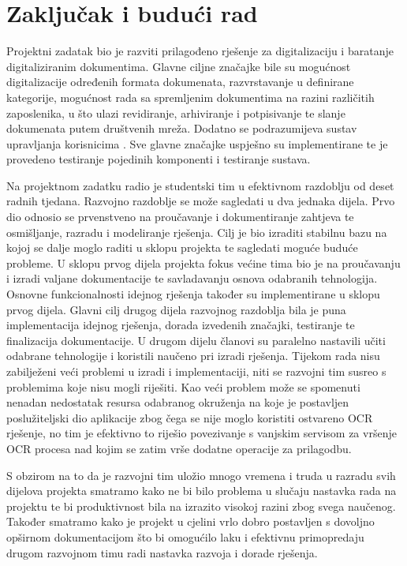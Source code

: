 \chapter{Zaključak i budući rad}
		
		{Projektni zadatak bio je razviti prilagođeno rješenje za digitalizaciju i baratanje digitaliziranim dokumentima. Glavne ciljne značajke bile su mogućnost digitalizacije određenih formata dokumenata, razvrstavanje u definirane kategorije, mogućnost rada sa spremljenim dokumentima na razini različitih zaposlenika, u što ulazi revidiranje, arhiviranje i potpisivanje te slanje dokumenata putem društvenih mreža. Dodatno se podrazumijeva sustav upravljanja korisnicima . Sve glavne značajke uspješno su implementirane te je provedeno testiranje pojedinih komponenti i testiranje sustava.}
		
		{Na projektnom zadatku radio je studentski tim u efektivnom razdoblju od deset radnih tjedana. Razvojno razdoblje se može sagledati u dva jednaka dijela. Prvo dio odnosio se prvenstveno na proučavanje i dokumentiranje zahtjeva te osmišljanje, razradu i modeliranje rješenja. Cilj je bio izraditi stabilnu bazu na kojoj se dalje moglo raditi u sklopu projekta te sagledati moguće buduće probleme. U sklopu prvog dijela projekta fokus većine tima bio je na proučavanju i izradi valjane dokumentacije te savladavanju osnova odabranih tehnologija. Osnovne funkcionalnosti idejnog rješenja također su implementirane u sklopu prvog dijela. Glavni cilj drugog dijela razvojnog razdoblja bila je puna implementacija idejnog rješenja, dorada izvedenih značajki, testiranje te finalizacija dokumentacije. U drugom dijelu članovi su paralelno nastavili učiti odabrane tehnologije i koristili naučeno pri izradi rješenja. Tijekom rada nisu zabilježeni veći problemi u izradi i implementaciji, niti se razvojni tim susreo s problemima koje nisu mogli riješiti. Kao veći problem može se spomenuti nenadan nedostatak resursa odabranog okruženja na koje je postavljen poslužiteljski dio aplikacije zbog čega se nije moglo koristiti ostvareno OCR rješenje, no tim je efektivno to riješio povezivanje s vanjskim servisom za vršenje OCR procesa nad kojim se zatim vrše dodatne operacije za prilagodbu.}
		
		{S obzirom na to da je razvojni tim uložio mnogo vremena i truda u razradu svih dijelova projekta smatramo kako ne bi bilo problema u slučaju nastavka rada na projektu te bi produktivnost bila na izrazito visokoj razini zbog svega naučenog. Također smatramo kako je projekt u cjelini vrlo dobro postavljen s dovoljno opširnom dokumentacijom što bi omogućilo laku i efektivnu primopredaju drugom razvojnom timu radi nastavka razvoja i dorade rješenja.}
		
